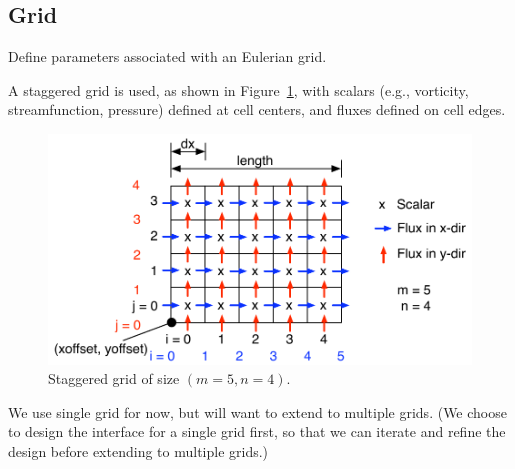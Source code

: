 \documentclass[11pt]{article}
\begin{document}
\subsection{Grid}
Define parameters associated with an Eulerian grid.

A staggered grid is used, as shown in Figure~\ref{fig:grid}, with scalars (e.g., vorticity, streamfunction, pressure) defined at cell centers, and fluxes defined on cell edges.
\begin{figure}[htbp]
	\begin{center}
		\includegraphics[width=4.5in]{Figures/grid.pdf}
	\end{center}
	\caption{Staggered grid of size $(m=5,n=4)$.}
	\label{fig:grid}
\end{figure}
We use single grid for now, but will want to extend to multiple grids.  (We choose to design the interface for a single grid first, so that we can iterate and refine the design before extending to multiple grids.)
\end{document}
